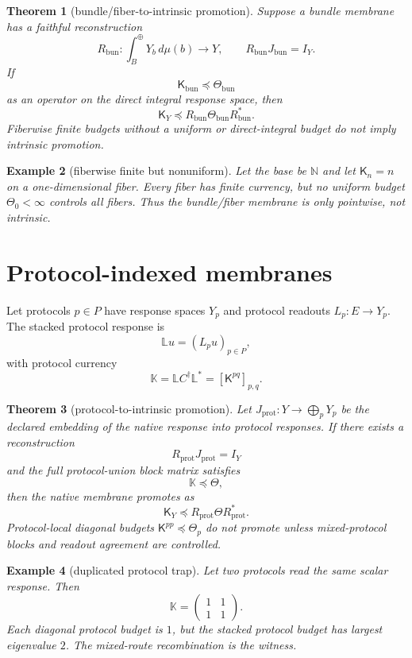 \documentclass[11pt]{article}
\newtheorem{theorem}{Theorem}[section]
\newtheorem{example}[theorem]{Example}
\newcommand{\K}{\mathsf K}
\newcommand{\Th}{\Theta}
\newcommand{\Loewner}{\preceq}
\begin{document}
\begin{theorem}[bundle/fiber-to-intrinsic promotion]
Suppose a bundle membrane has a faithful reconstruction
\[
R_{\mathrm{bun}}:\int_B^{\oplus}Y_b\,d\mu(b)\to Y,
\qquad R_{\mathrm{bun}}J_{\mathrm{bun}}=I_Y.
\]
If
\[
\K_{\mathrm{bun}}\Loewner\Th_{\mathrm{bun}}
\]
as an operator on the direct integral response space, then
\[
\K_Y\Loewner R_{\mathrm{bun}}\Th_{\mathrm{bun}}R_{\mathrm{bun}}^*.
\]
Fiberwise finite budgets without a uniform or direct-integral budget do not imply intrinsic promotion.
\end{theorem}

\begin{example}[fiberwise finite but nonuniform]
Let the base be \(\mathbb N\) and let \(\K_n=n\) on a one-dimensional fiber.  Every fiber has finite currency, but no uniform budget \(\Theta_0<\infty\) controls all fibers.  Thus the bundle/fiber membrane is only pointwise, not intrinsic.
\end{example}

\section{Protocol-indexed membranes}

Let protocols \(p\in P\) have response spaces \(Y_p\) and protocol readouts \(L_p:E\to Y_p\).  The stacked protocol response is
\[
\mathbb L u=(L_pu)_{p\in P},
\]
with protocol currency
\[
\mathbb K=\mathbb L C^\dagger\mathbb L^*=[\K^{pq}]_{p,q}.
\]

\begin{theorem}[protocol-to-intrinsic promotion]
Let \(J_{\mathrm{prot}}:Y\to\bigoplus_pY_p\) be the declared embedding of the native response into protocol responses.  If there exists a reconstruction
\[
R_{\mathrm{prot}}J_{\mathrm{prot}}=I_Y
\]
and the full protocol-union block matrix satisfies
\[
\mathbb K\Loewner\mathbb\Theta,
\]
then the native membrane promotes as
\[
\K_Y\Loewner R_{\mathrm{prot}}\mathbb\Theta R_{\mathrm{prot}}^*.
\]
Protocol-local diagonal budgets \(\K^{pp}\Loewner\Theta_p\) do not promote unless mixed-protocol blocks and readout agreement are controlled.
\end{theorem}

\begin{example}[duplicated protocol trap]
Let two protocols read the same scalar response.  Then
\[
\mathbb K=\begin{pmatrix}1&1\\1&1\end{pmatrix}.
\]
Each diagonal protocol budget is \(1\), but the stacked protocol budget has largest eigenvalue \(2\).  The mixed-route recombination is the witness.
\end{example}
\end{document}
